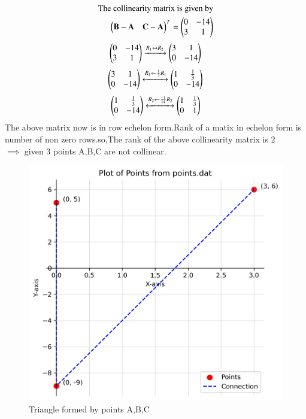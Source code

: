 \documentclass[journal]{IEEEtran}
\begin{document}
\begin{align}
\text{The collinearity matrix is given by}\\
\begin{pmatrix}
   \mathbf{B}-\mathbf{A} & \mathbf{C}-\mathbf{A}
 \end{pmatrix}^T = \begin{pmatrix}
   0 & -14 
   \\
   3 & 1
   \end{pmatrix}\\
\end{align}
\begin{align}
    \begin{pmatrix}
   0 & -14 
   \\
   3 & 1
   \end{pmatrix}
  &\xrightarrow{R_1 \leftrightarrow R_2}
   \begin{pmatrix}
   3 & 1
   \\
   0 & -14
   \end{pmatrix}\\
 \end{align}
 \begin{align}
     \begin{pmatrix}
   3 & 1
   \\
   0 & -14
   \end{pmatrix}\xleftrightarrow[]{R_1 \leftarrow {\frac{1}{3}R_1}}
   \begin{pmatrix}
   1 & \frac{1}{3}
   \\
   0 & -14
   \end{pmatrix}
\end{align}
\begin{align}
    \begin{pmatrix}
   1 & \frac{1}{3}
   \\
   0 & -14
   \end{pmatrix}\xleftrightarrow[]{R_2 \leftarrow {\frac{-1}{14}R_2}}
   \begin{pmatrix}
   1 & \frac{1}{3}
   \\
   0 & 1
   \end{pmatrix}
\end{align}
 The above matrix now is in row echelon form.Rank of a matix in echelon form is number of non zero rows.so,The rank of the above collinearity matrix is 2\\
 $\implies$ given 3 points A,B,C are not collinear.
 \begin{figure}[h!]
   \centering
   \includegraphics[width=0.5\linewidth]{figs/01.png}
   \caption{Triangle formed by points A,B,C}
   \label{}
\end{figure}
\end{document}
